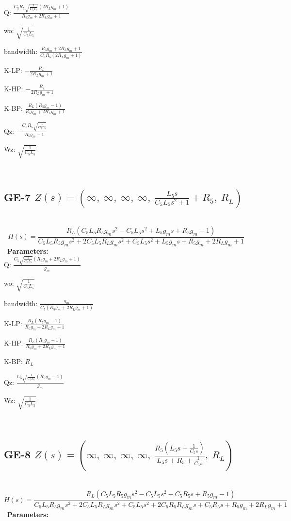 \documentclass{article}
\begin{document}
Q: $\frac{C_{5} R_{5} \sqrt{\frac{1}{C_{5} L_{5}}} \left(2 R_{L} g_{m} + 1\right)}{R_{5} g_{m} + 2 R_{L} g_{m} + 1}$\ 

wo: $\sqrt{\frac{1}{C_{5} L_{5}}}$\ 

bandwidth: $\frac{R_{5} g_{m} + 2 R_{L} g_{m} + 1}{C_{5} R_{5} \left(2 R_{L} g_{m} + 1\right)}$\ 

K-LP: $- \frac{R_{L}}{2 R_{L} g_{m} + 1}$\ 

K-HP: $- \frac{R_{L}}{2 R_{L} g_{m} + 1}$\ 

K-BP: $\frac{R_{L} \left(R_{5} g_{m} - 1\right)}{R_{5} g_{m} + 2 R_{L} g_{m} + 1}$\ 

Qz: $- \frac{C_{5} R_{5} \sqrt{\frac{1}{C_{5} L_{5}}}}{R_{5} g_{m} - 1}$\ 

Wz: $\sqrt{\frac{1}{C_{5} L_{5}}}$\ 

\ 

\subsection{GE-7 $Z(s) = \left( \infty, \  \infty, \  \infty, \  \infty, \  \frac{L_{5} s}{C_{5} L_{5} s^{2} + 1} + R_{5}, \  R_{L}\right)$ } \ 
\textbf{\[H(s) = \frac{R_{L} \left(C_{5} L_{5} R_{5} g_{m} s^{2} - C_{5} L_{5} s^{2} + L_{5} g_{m} s + R_{5} g_{m} - 1\right)}{C_{5} L_{5} R_{5} g_{m} s^{2} + 2 C_{5} L_{5} R_{L} g_{m} s^{2} + C_{5} L_{5} s^{2} + L_{5} g_{m} s + R_{5} g_{m} + 2 R_{L} g_{m} + 1}\] } \ 
\textbf{Parameters:}\\ 

Q: $\frac{C_{5} \sqrt{\frac{1}{C_{5} L_{5}}} \left(R_{5} g_{m} + 2 R_{L} g_{m} + 1\right)}{g_{m}}$\ 

wo: $\sqrt{\frac{1}{C_{5} L_{5}}}$\ 

bandwidth: $\frac{g_{m}}{C_{5} \left(R_{5} g_{m} + 2 R_{L} g_{m} + 1\right)}$\ 

K-LP: $\frac{R_{L} \left(R_{5} g_{m} - 1\right)}{R_{5} g_{m} + 2 R_{L} g_{m} + 1}$\ 

K-HP: $\frac{R_{L} \left(R_{5} g_{m} - 1\right)}{R_{5} g_{m} + 2 R_{L} g_{m} + 1}$\ 

K-BP: $R_{L}$\ 

Qz: $\frac{C_{5} \sqrt{\frac{1}{C_{5} L_{5}}} \left(R_{5} g_{m} - 1\right)}{g_{m}}$\ 

Wz: $\sqrt{\frac{1}{C_{5} L_{5}}}$\ 

\ 

\subsection{GE-8 $Z(s) = \left( \infty, \  \infty, \  \infty, \  \infty, \  \frac{R_{5} \left(L_{5} s + \frac{1}{C_{5} s}\right)}{L_{5} s + R_{5} + \frac{1}{C_{5} s}}, \  R_{L}\right)$ } \ 
\textbf{\[H(s) = \frac{R_{L} \left(C_{5} L_{5} R_{5} g_{m} s^{2} - C_{5} L_{5} s^{2} - C_{5} R_{5} s + R_{5} g_{m} - 1\right)}{C_{5} L_{5} R_{5} g_{m} s^{2} + 2 C_{5} L_{5} R_{L} g_{m} s^{2} + C_{5} L_{5} s^{2} + 2 C_{5} R_{5} R_{L} g_{m} s + C_{5} R_{5} s + R_{5} g_{m} + 2 R_{L} g_{m} + 1}\] } \ 
\textbf{Parameters:}\\ 
\end{document}
